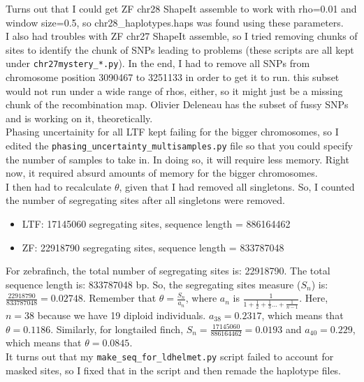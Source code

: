 \documentclass[idxtotoc,hyperref,openany,oneside]{labbook} %
\begin{document}
Turns out that I could get ZF chr28 ShapeIt assemble to work with rho=0.01 and window size=0.5, so chr28\_haplotypes.haps was found using these parameters. \\

I also had troubles with ZF chr27 ShapeIt assemble, so I tried removing chunks of sites to identify the chunk of SNPs leading to problems (these scripts are all kept under \verb+chr27mystery_*.py+). In the end, I had to remove all SNPs from chromosome position 3090467 to 3251133 in order to get it to run. this subset would not run under a wide range of rhos, either, so it might just be a missing chunk of the recombination map. Olivier Deleneau has the subset of fussy SNPs and is working on it, theoretically. \\

Phasing uncertainity for all LTF kept failing for the bigger chromosomes, so I edited the \verb+phasing_uncertainty_multisamples.py+ file so that you could specify the number of samples to take in. In doing so, it will require less memory. Right now, it required absurd amounts of memory for the bigger chromosomes. \\

I then had to recalculate $\theta$, given that I had removed all singletons. So, I counted the number of segregating sites after all singletons were removed.
\begin{itemize}
\item LTF: 17145060 segregating sites, sequence length = 886164462
\item ZF: 22918790 segregating sites, sequence length = 833787048
\end{itemize}
For zebrafinch, the total number of segregating sites is: 22918790. The total sequence length is: 833787048 bp. So, the segregating sites measure ($S_n$) is: $\frac{22918790}{833787048} = 0.02748$. Remember that $\theta = \frac{S_n}{a_n}$, where $a_n$ is $\frac{1}{1+\frac{1}{2}+\frac{1}{3} ... + \frac{1}{n - 1}}$. Here, $n=38$ because we have 19 diploid individuals. $a_{38} = 0.2317$, which means that $\theta = 0.1186$. Similarly, for longtailed finch, $S_n = \frac{17145060}{886164462} = 0.0193$ and $a_{40} = 0.229$, which means that $\theta = 0.0845$. \\

It turns out that my \verb+make_seq_for_ldhelmet.py+ script failed to account for masked sites, so I fixed that in the script and then remade the haplotype files. \\
\end{document}
